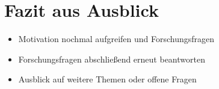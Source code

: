 \chapter{Fazit aus Ausblick}
\label{Fazit}

\begin{itemize}
    \item Motivation nochmal aufgreifen und Forschungsfragen
    \item Forschungsfragen abschließend erneut beantworten
    \item Ausblick auf weitere Themen oder offene Fragen
\end{itemize}